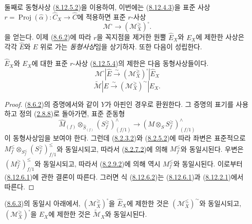 \begin{env}[8.12.5]
둘째로 동형사상 (\hyperref[II.8.12.5.2-ko]{8.12.5.2})을 이용하여,
이번에는 (\hyperref[II.8.12.4.3-ko]{8.12.4.3})을 표준 사상
$r=\operatorname{Proj}(\widehat{\alpha}):\widehat{C}_X\to
\widehat{C}$에 적용하면 표준 $r$-사상
\begin{equation}
\label{II.8.12.5.4-ko}
  \mathcal{M}^{\square}\to(\mathcal{M}_X^{\geq})^{\square}.
\tag{8.12.5.4}
\end{equation}
을 얻는다. 이제 (\hyperref[II.8.6.2-ko]{8.6.2})에 따라 $r$을
꼭지점을 제거한 원뿔 $\widehat{E}_X$와 $E_X$에 제한한 사상은 각각
$\widehat{E}$와 $E$ 위로 가는 \emph{동형사상}임을 상기하자. 또한
다음이 성립한다.
\end{env}

\begin{proposition}[8.12.6]
\label{II.8.12.6-ko}
$\widehat{E}_X$와 $E_X$에 대한 표준 $r$-사상
(\hyperref[II.8.12.5.4-ko]{8.12.5.4})의 제한은 다음 동형사상들이다.
\begin{equation}
\label{II.8.12.6.1-ko}
  \mathcal{M}^{\square}|\widehat{E}
  \xrightarrow{\sim}(\mathcal{M}_X^{\geq})^{\square}|\widehat{E}_X
\tag{8.12.6.1}
\end{equation}
\begin{equation}
\label{II.8.12.6.2-ko}
  \widetilde{\mathcal{M}}|E
  \xrightarrow{\sim}(\mathcal{M}_X^{\geq})^{\sim}|E_X.
\tag{8.12.6.2}
\end{equation}
\end{proposition}

\begin{proof}
(\hyperref[II.8.6.2-ko]{8.6.2})의 증명에서와 같이 $Y$가 아핀인
경우로 환원한다. 그 증명의 표기를 사용하고 정의
(\hyperref[II.2.8.8-ko]{2.8.8})로 돌아가면, 표준 준동형
\[
  \widehat{M}_{(f)}\otimes_{\widehat{S}_{(f)}}
  (S_f^{\geq})_{(f/1)}^{\wedge}
  \to(M\otimes_S S_f^{\geq})_{(f/1)}^{\wedge}
\]
이 동형사상임을 보여야 한다. 그런데
(\hyperref[II.8.2.3.2-ko]{8.2.3.2})와
(\hyperref[II.8.2.5.2-ko]{8.2.5.2})에 따라 좌변은 표준적으로
$M_f^{\leq}\otimes_{S_f^{\leq}}(S_f^{\geq})_{f/1}^{\leq}$와 동일시되고,
따라서 (\hyperref[II.8.2.7.2-ko]{8.2.7.2})에 의해 $M_f^{\leq}$와
동일시된다. 우변은 $(M_f^{\geq})_{f/1}^{\leq}$와 동일시되고,
따라서 (\hyperref[II.8.2.9.2-ko]{8.2.9.2})에 의해 역시
$M_f^{\leq}$와 동일시된다. 이로부터
(\hyperref[II.8.12.6.1-ko]{8.12.6.1})에 관한 결론이 따른다.
그러면 식 (\hyperref[II.8.12.6.2-ko]{8.12.6.2})는
(\hyperref[II.8.12.6.1-ko]{8.12.6.1})과
(\hyperref[II.8.12.2.1-ko]{8.12.2.1})에서 따른다.
\end{proof}

\begin{corollary}[8.12.7]
\label{II.8.12.7-ko}
(\hyperref[II.8.6.3-ko]{8.6.3})의 동일시 아래에서,
$(\mathcal{M}_X^{\geq})^{\square}$을 $\widehat{E}_X$에 제한한 것은
$(\mathcal{M}_X^{\leq})^{\sim}$와 동일시되고,
$(\mathcal{M}_X^{\geq})^{\square}$을 $E_X$에 제한한 것은
$\widetilde{\mathcal{M}}_X$와 동일시된다.
\end{corollary}

